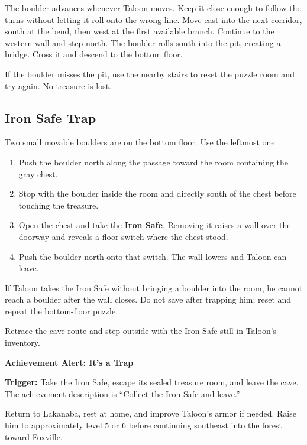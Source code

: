 \documentclass[
  american,
  10pt,
  letterpaper,
  oneside,
  open=any]{scrreprt}
\providecommand{\tightlist}{%
  \setlength{\itemsep}{0pt}\setlength{\parskip}{0pt}}
\begin{document}
The boulder advances whenever Taloon moves. Keep it close enough to
follow the turns without letting it roll onto the wrong line. Move east
into the next corridor, south at the bend, then west at the first
available branch. Continue to the western wall and step north. The
boulder rolls south into the pit, creating a bridge. Cross it and
descend to the bottom floor.

If the boulder misses the pit, use the nearby stairs to reset the puzzle
room and try again. No treasure is lost.

\subsection{Iron Safe Trap}\label{iron-safe-trap}

Two small movable boulders are on the bottom floor. Use the leftmost
one.

\begin{enumerate}
\def\labelenumi{\arabic{enumi}.}
\tightlist
\item
  Push the boulder north along the passage toward the room containing
  the gray chest.
\item
  Stop with the boulder inside the room and directly south of the chest
  before touching the treasure.
\item
  Open the chest and take the \textbf{Iron Safe}. Removing it raises a
  wall over the doorway and reveals a floor switch where the chest
  stood.
\item
  Push the boulder north onto that switch. The wall lowers and Taloon
  can leave.
\end{enumerate}

If Taloon takes the Iron Safe without bringing a boulder into the room,
he cannot reach a boulder after the wall closes. Do not save after
trapping him; reset and repeat the bottom-floor puzzle.

Retrace the cave route and step outside with the Iron Safe still in
Taloon's inventory.

\begin{achievementalert}

\textbf{Achievement Alert: It's a Trap}

\textbf{Trigger:} Take the Iron Safe, escape its sealed treasure room,
and leave the cave. The achievement description is ``Collect the Iron
Safe and leave.''

\end{achievementalert}

Return to Lakanaba, rest at home, and improve Taloon's armor if needed.
Raise him to approximately level 5 or 6 before continuing southeast into
the forest toward Foxville.
\end{document}
